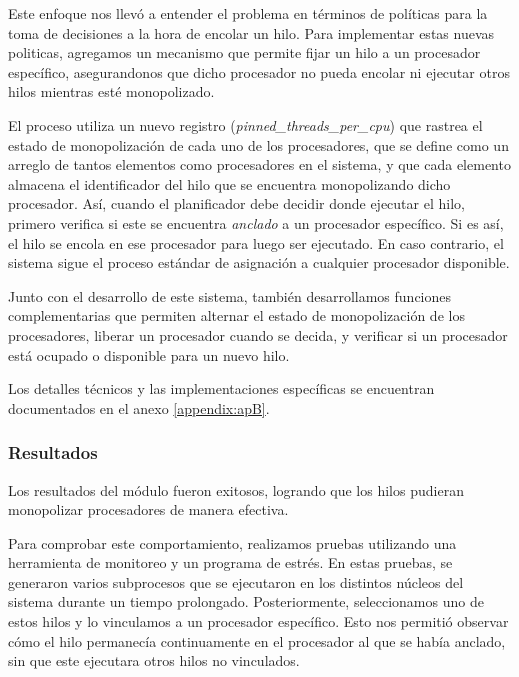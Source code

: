 Este enfoque nos llevó a entender el problema en términos de políticas para la toma de decisiones a la hora de encolar un hilo. Para implementar estas nuevas politicas, agregamos un mecanismo que permite fijar un hilo a un procesador específico, asegurandonos que dicho procesador no pueda encolar ni ejecutar otros hilos mientras esté monopolizado.

El proceso utiliza un nuevo registro (\textit{pinned\_threads\_per\_cpu}) que rastrea el estado de monopolización de cada uno de los procesadores, que se define como un arreglo de tantos elementos como procesadores en el sistema, y que cada elemento almacena el identificador del hilo que se encuentra monopolizando dicho procesador. Así, cuando el planificador debe decidir donde ejecutar el hilo, primero verifica si este se encuentra \textit{anclado} a un procesador específico. Si es así, el hilo se encola en ese procesador para luego ser ejecutado. En caso contrario, el sistema sigue el proceso estándar de asignación a cualquier procesador disponible.

Junto con el desarrollo de este sistema, también desarrollamos funciones complementarias que permiten alternar el estado de monopolización de los procesadores, liberar un procesador cuando se decida, y verificar si un procesador está ocupado o disponible para un nuevo hilo.

Los detalles técnicos y las implementaciones específicas se encuentran documentados en el anexo \ref{appendix:apB}.


\subsubsection{Resultados}

Los resultados del módulo fueron exitosos, logrando que los hilos pudieran monopolizar procesadores de manera efectiva.

Para comprobar este comportamiento, realizamos pruebas utilizando una herramienta de monitoreo y un programa de estrés. En estas pruebas, se generaron varios subprocesos que se ejecutaron en los distintos núcleos del sistema durante un tiempo prolongado. Posteriormente, seleccionamos uno de estos hilos y lo vinculamos a un procesador específico. Esto nos permitió observar cómo el hilo permanecía continuamente en el procesador al que se había anclado, sin que este ejecutara otros hilos no vinculados.

